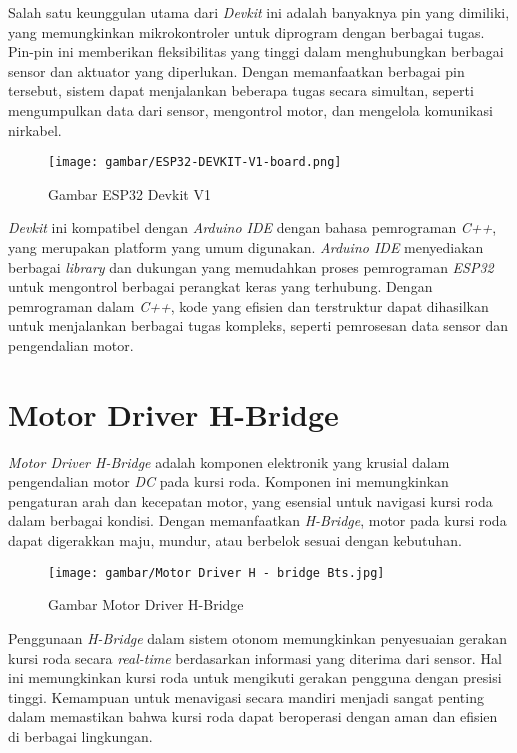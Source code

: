 Salah satu keunggulan utama dari \emph{Devkit} ini adalah banyaknya pin yang dimiliki, yang memungkinkan mikrokontroler untuk diprogram dengan berbagai tugas. Pin-pin ini memberikan fleksibilitas yang tinggi dalam menghubungkan berbagai sensor dan aktuator yang diperlukan. Dengan memanfaatkan berbagai pin tersebut, sistem dapat menjalankan beberapa tugas secara simultan, seperti mengumpulkan data dari sensor, mengontrol motor, dan mengelola komunikasi nirkabel.

\begin{figure}[H]
  \centering
  \texttt{[image: gambar/ESP32-DEVKIT-V1-board.png]}
  \caption{Gambar ESP32 Devkit V1}
  \label{fig:Gambar ESP32Devkit V1}
\end{figure}

\emph{Devkit} ini kompatibel dengan \emph{Arduino IDE} dengan bahasa pemrograman \emph{C++}, yang merupakan platform yang umum digunakan. \emph{Arduino IDE} menyediakan berbagai \emph{library} dan dukungan yang memudahkan proses pemrograman \emph{ESP32} untuk mengontrol berbagai perangkat keras yang terhubung. Dengan pemrograman dalam \emph{C++}, kode yang efisien dan terstruktur dapat dihasilkan untuk menjalankan berbagai tugas kompleks, seperti pemrosesan data sensor dan pengendalian motor.

\section{Motor Driver H-Bridge}
\label{sec:Motor}

\emph{Motor Driver H-Bridge} adalah komponen elektronik yang krusial dalam pengendalian motor \emph{DC} pada kursi roda. Komponen ini memungkinkan pengaturan arah dan kecepatan motor, yang esensial untuk navigasi kursi roda dalam berbagai kondisi. Dengan memanfaatkan \emph{H-Bridge}, motor pada kursi roda dapat digerakkan maju, mundur, atau berbelok sesuai dengan kebutuhan.

\begin{figure}[H]
  \centering
  \texttt{[image: gambar/Motor Driver H - bridge Bts.jpg]}
  \caption{Gambar Motor Driver H-Bridge}
  \label{fig:Gambar Motor Driver H-Bridge}
\end{figure}

Penggunaan \emph{H-Bridge} dalam sistem otonom memungkinkan penyesuaian gerakan kursi roda secara \emph{real-time} berdasarkan informasi yang diterima dari sensor. Hal ini memungkinkan kursi roda untuk mengikuti gerakan pengguna dengan presisi tinggi. Kemampuan untuk menavigasi secara mandiri menjadi sangat penting dalam memastikan bahwa kursi roda dapat beroperasi dengan aman dan efisien di berbagai lingkungan.

